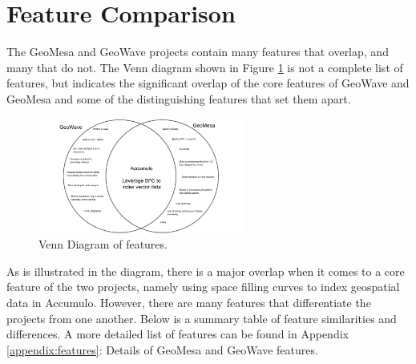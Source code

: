 \section{Feature Comparison}
\label{sec:featurecompare}

The GeoMesa and GeoWave projects contain many features that overlap, and many that do not.
The Venn diagram shown in Figure \ref{venn} is not a complete list of features,
but indicates the significant overlap of the core features of GeoWave and GeoMesa and some of the distinguishing features that set them apart.

\begin{figure}[h!tb]
  \centering
  \includegraphics[width=0.60\textwidth]{../docs/img/venn-diagram.png}
  \caption{Venn Diagram of features.}
  \label{venn}
\end{figure}

As is illustrated in the diagram, there is a major overlap when it comes to a core feature of the two projects, namely using space filling curves to index geospatial data in Accumulo.
However, there are many features that differentiate the projects from one another.
Below is a summary table of feature similarities and differences.
A more detailed list of features can be found in Appendix \ref{appendix:features}: Details of GeoMesa and GeoWave features.







